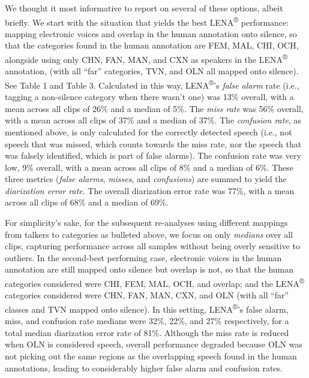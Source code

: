 \documentclass[english,table,man,floatsintext]{apa6}
\begin{document}
We thought it most informative to report on several of these options, albeit briefly. We start with the situation that yields the best LENA\textsuperscript{®} performance: mapping electronic voices and overlap in the human annotation onto silence, so that the categories found in the human annotation are FEM, MAL, CHI, OCH, alongside using only CHN, FAN, MAN, and CXN as speakers in the LENA\textsuperscript{®} annotation, (with all \enquote{far} categories, TVN, and OLN all mapped onto silence). See Table 1 and Table 3.
Calculated in this way, LENA\textsuperscript{®}'s \emph{false alarm} rate (i.e., tagging a non-silence category when there wasn't one) was 13\% overall, with a mean across all clips of 26\% and a median of 5\%. The \emph{miss rate} was 56\% overall, with a mean across all clips of 37\% and a median of 37\%. The \emph{confusion rate}, as mentioned above, is only calculated for the correctly detected speech (i.e., not speech that was missed, which counts towards the miss rate, nor the speech that was falsely identified, which is part of false alarms). The confusion rate was very low, 9\% overall, with a mean across all clips of 8\% and a median of 6\%. These three metrics (\emph{false alarms}, \emph{misses}, and \emph{confusions}) are summed to yield the \emph{diarization error rate}. The overall diarization error rate was 77\%, with a mean across all clips of 68\% and a median of 69\%.

For simplicity's sake, for the subsequent re-analyses using different mappings from talkers to categories as bulleted above, we focus on only \emph{medians} over all clips, capturing performance across all samples without being overly sensitive to outliers. In the second-best performing case, electronic voices in the human annotation are still mapped onto silence but overlap is not, so that the human categories considered were CHI, FEM, MAL, OCH, and overlap; and the LENA\textsuperscript{®} categories considered were CHN, FAN, MAN, CXN, and OLN (with all \enquote{far} classes and TVN mapped onto silence). In this setting, LENA\textsuperscript{®}'s false alarm, miss, and confusion rate medians were 32\%, 22\%, and 27\% respectively, for a total median diarization error rate of 81\%. Although the miss rate is reduced when OLN is considered speech, overall performance degraded because OLN was not picking out the same regions as the overlapping speech found in the human annotations, leading to considerably higher false alarm and confusion rates.
\end{document}
